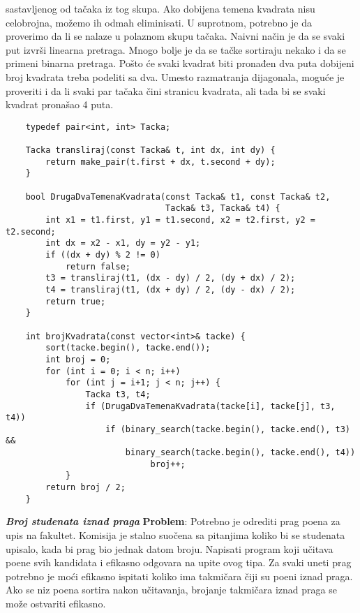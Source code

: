 \documentclass{article}
\begin{document}
sastavljenog od tačaka iz tog skupa. Ako dobijena temena kvadrata nisu celobrojna, možemo ih odmah eliminisati. U
suprotnom, potrebno je da proverimo da li se nalaze u polaznom skupu tačaka.
Naivni način je da se svaki put izvrši linearna pretraga. Mnogo bolje je da se
tačke sortiraju nekako i da se primeni binarna pretraga.
Pošto će svaki kvadrat biti pronađen dva puta dobijeni broj kvadrata treba podeliti sa dva.
Umesto razmatranja dijagonala, moguće je proveriti i da li svaki par tačaka čini
stranicu kvadrata, ali tada bi se svaki kvadrat pronašao 4 puta.
\begin{lstlisting}
    typedef pair<int, int> Tacka;
    
    Tacka transliraj(const Tacka& t, int dx, int dy) {
        return make_pair(t.first + dx, t.second + dy);
    }
    
    bool DrugaDvaTemenaKvadrata(const Tacka& t1, const Tacka& t2,
                                Tacka& t3, Tacka& t4) {
        int x1 = t1.first, y1 = t1.second, x2 = t2.first, y2 = t2.second;
        int dx = x2 - x1, dy = y2 - y1;
        if ((dx + dy) % 2 != 0)
            return false;
        t3 = transliraj(t1, (dx - dy) / 2, (dy + dx) / 2);
        t4 = transliraj(t1, (dx + dy) / 2, (dy - dx) / 2);
        return true;
    }
    
    int brojKvadrata(const vector<int>& tacke) {
        sort(tacke.begin(), tacke.end());
        int broj = 0;
        for (int i = 0; i < n; i++)
            for (int j = i+1; j < n; j++) {
                Tacka t3, t4;
                if (DrugaDvaTemenaKvadrata(tacke[i], tacke[j], t3, t4))
                    if (binary_search(tacke.begin(), tacke.end(), t3) &&
                        binary_search(tacke.begin(), tacke.end(), t4))
                             broj++;
            }
        return broj / 2;
    }
\end{lstlisting}
\vspace{2cm}
\textit{\textbf{Broj studenata iznad praga}}
\vspace{0.1cm}\newline
\textbf{Problem}: Potrebno je odrediti prag poena za upis na fakultet. Komisija je
stalno suočena sa pitanjima koliko bi se studenata upisalo, kada bi prag bio
jednak datom broju. Napisati program koji učitava poene svih kandidata i
efikasno odgovara na upite ovog tipa.
\newline
Za svaki uneti prag potrebno je moći efikasno ispitati koliko ima takmičara čiji
su poeni iznad praga. Ako se niz poena sortira nakon
učitavanja, brojanje takmičara iznad praga se može ostvariti efikasno.
\end{document}
